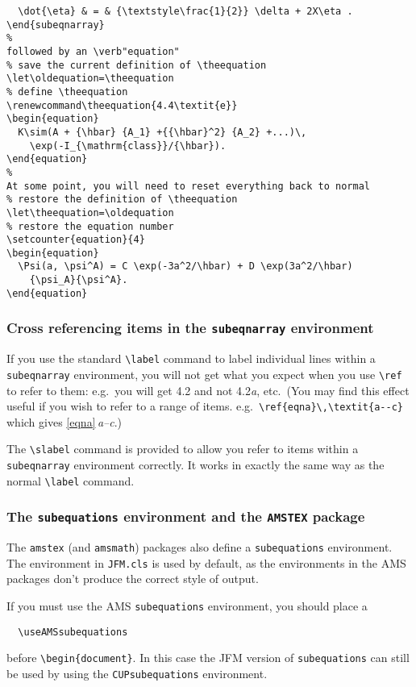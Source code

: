 \documentclass{jfm}
\newcommand\etc{etc.\ }
\newcommand\eg{e.g.\ }
\begin{document}
\begin{verbatim}
  \dot{\eta} & = & {\textstyle\frac{1}{2}} \delta + 2X\eta .
\end{subeqnarray}
%
followed by an \verb"equation"
% save the current definition of \theequation
\let\oldequation=\theequation
% define \theequation
\renewcommand\theequation{4.4\textit{e}}
\begin{equation}
  K\sim(A + {\hbar} {A_1} +{{\hbar}^2} {A_2} +...)\,
    \exp(-I_{\mathrm{class}}/{\hbar}).
\end{equation}
%
At some point, you will need to reset everything back to normal
% restore the definition of \theequation
\let\theequation=\oldequation
% restore the equation number
\setcounter{equation}{4}
\begin{equation}
  \Psi(a, \psi^A) = C \exp(-3a^2/\hbar) + D \exp(3a^2/\hbar)
    {\psi_A}{\psi^A}.
\end{equation}
\end{verbatim}

\subsubsection{Cross referencing items in the \texttt{subeqnarray} environment}

If you use the standard \verb"\label" command to label
individual lines within a \texttt{subeqnarray} environment, you will not
get what you expect when you use \verb"\ref" to refer to them: \eg you
will get 4.2 and not 4.2\textit{a}, \etc (You may find this effect useful if
you wish to refer to a range of items. \eg \verb"\ref{eqna}\,\textit{a--c}"
which gives \ref{eqna}\,\textit{a--c}.)

The \verb"\slabel" command is provided to allow you refer to items within a
\texttt{subeqnarray} environment correctly. It works in exactly the same
way as the normal \verb"\label" command.

\subsubsection{The \texttt{subequations} environment and the
  \texttt{AMSTEX} package} \label{sub:amstex}

The \verb"amstex" (and \verb"amsmath") packages also define a
\verb"subequations" environment.  The environment in \verb"JFM.cls" is used
by default, as the environments in the AMS packages don't produce the correct
style of output.

If you must use the AMS \verb"subequations" environment,
you should place a
\begin{verbatim}
  \useAMSsubequations
\end{verbatim}
before \verb"\begin{document}".
In this case the JFM version of \verb"subequations" can still be used by
using the \verb"CUPsubequations" environment.
\end{document}
